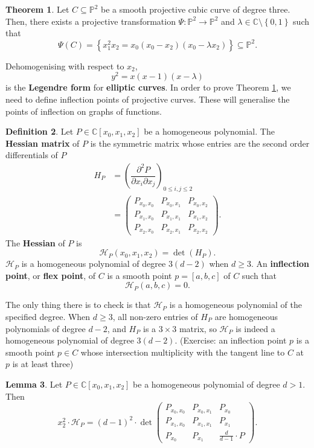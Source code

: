 \documentclass{article}
\newcommand{\C}{\mathbb{C}}
\renewcommand{\P}{\mathbb{P}}
\renewcommand{\H}{\mathcal{H}}
\newcommand{\rb}[1]{\left( #1 \right)}
\renewcommand{\sb}[1]{\left[ #1 \right]}
\newcommand{\cb}[1]{\left\{ #1 \right\}}
\theoremstyle{definition}\newtheorem{definition}{Definition}[section]
\theoremstyle{definition}\newtheorem{notation}[definition]{Notation}
\theoremstyle{definition}\newtheorem{remark}[definition]{Remark}
\theoremstyle{definition}\newtheorem{example1}[definition]{Example}
\theoremstyle{definition}\newtheorem{fact}{Fact}
\theoremstyle{definition}\newtheorem{exercise}{Exercise}
\theoremstyle{definition}\newtheorem*{example2}{Example}
\newtheorem{lemma}[definition]{Lemma}
\newtheorem{theorem}[definition]{Theorem}
\begin{document}
\begin{theorem}
\label{thm:13.1}
Let $ C \subseteq \P^2 $ be a smooth projective cubic curve of degree three. Then, there exists a projective transformation $ \Psi : \P^2 \to \P^2 $ and $ \lambda \in \C \setminus \cb{0, 1} $ such that
$$ \Psi\rb{C} = \cb{x_1^2x_2 = x_0\rb{x_0 - x_2}\rb{x_0 - \lambda x_2}} \subseteq \P^2. $$
\end{theorem}

Dehomogenising with respect to $ x_2 $,
$$ y^2 = x\rb{x - 1}\rb{x - \lambda} $$
is the \textbf{Legendre form} for \textbf{elliptic curves}. In order to prove Theorem \ref{thm:13.1}, we need to define inflection points of projective curves. These will generalise the points of inflection on graphs of functions.

\begin{definition}
\label{def:13.2}
Let $ P \in \C\sb{x_0, x_1, x_2} $ be a homogeneous polynomial. The \textbf{Hessian matrix} of $ P $ is the symmetric matrix whose entries are the second order differentials of $ P $
\begin{align*}
H_P
& = \rb{\dfrac{\partial^2 P}{\partial x_i \partial x_j}}_{0 \le i, j \le 2} \\
& = \begin{pmatrix}
P_{x_0, x_0} & P_{x_0, x_1} & P_{x_0, x_2} \\
P_{x_1, x_0} & P_{x_1, x_1} & P_{x_1, x_2} \\
P_{x_2, x_0} & P_{x_2, x_1} & P_{x_2, x_2}
\end{pmatrix}.
\end{align*}
The \textbf{Hessian} of $ P $ is
$$ \H_P\rb{x_0, x_1, x_2} = \det\rb{H_P}. $$
$ \H_P $ is a homogeneous polynomial of degree $ 3\rb{d - 2} $ when $ d \ge 3 $. An \textbf{inflection point}, or \textbf{flex point}, of $ C $ is a smooth point $ p = \sb{a, b, c} $ of $ C $ such that
$$ \H_P\rb{a, b, c} = 0. $$
\end{definition}

The only thing there is to check is that $ \H_P $ is a homogeneous polynomial of the specified degree. When $ d \ge 3 $, all non-zero entries of $ H_P $ are homogeneous polynomials of degree $ d - 2 $, and $ H_P $ is a $ 3 \times 3 $ matrix, so $ \H_P $ is indeed a homogeneous polynomial of degree $ 3\rb{d - 2} $. (Exercise: an inflection point $ p $ is a smooth point $ p \in C $ whose intersection multiplicity with the tangent line to $ C $ at $ p $ is at least three)

\begin{lemma}
\label{lem:13.3}
Let $ P \in \C\sb{x_0, x_1, x_2} $ be a homogeneous polynomial of degree $ d > 1 $. Then
\begin{equation}
\label{eq:10}
x_2^2 \cdot \H_P = \rb{d - 1}^2 \cdot \det\begin{pmatrix}
P_{x_0, x_0} & P_{x_0, x_1} & P_{x_0} \\
P_{x_1, x_0} & P_{x_1, x_1} & P_{x_1} \\
P_{x_0} & P_{x_1} & \tfrac{d}{d - 1} \cdot P
\end{pmatrix}.
\end{equation}
\end{lemma}
\end{document}
